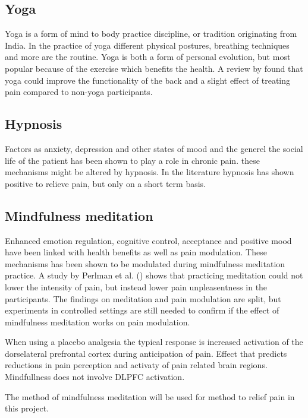 \subsection{Yoga}
Yoga is a form of mind to body practice discipline, or tradition originating from India. In the practice of yoga different physical postures, breathing techniques and more are the routine. 
Yoga is both a form of personal evolution, but most popular because of the exercise which benefits the health.
A review by \cite{Whitehead2017} found that yoga could improve the functionality of the back and a slight effect of treating pain compared to non-yoga participants. 

\subsection{Hypnosis}
Factors as anxiety, depression and other states of mood and the generel the social life of the patient has been shown to play a role in chronic pain. these mechanisms might be altered by hypnosis.
In the literature hypnosis has shown positive to relieve pain, but only on a short term basis. \cite{Dhanani2011}

\subsection{Mindfulness meditation}
Enhanced emotion regulation, cognitive control, acceptance and positive mood have been linked with health benefits as well as pain modulation. These mechanisms has been shown to be modulated during mindfulness meditation practice.
A study by Perlman et al. (\cite{Perlman2010}) shows that practicing meditation could not lower the intensity of pain, but instead lower pain unpleasentness in the participants. The findings on meditation and pain modulation are split, but experiments in controlled settings are still needed to confirm if the effect of mindfulness meditation works on pain modulation. \cite{Zeidan2012, Perlman2010}

When using a placebo analgesia the typical response is increased activation of the dorselateral prefrontal cortex during anticipation of pain. Effect that predicts reductions in pain perception and activaty of pain related brain regions. Mindfullness does not involve DLPFC activation. \cite{Zeidan2012}


The method of mindfulness meditation will be used for method to relief pain in this project.